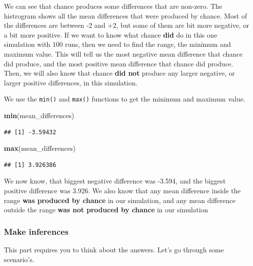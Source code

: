 \documentclass[]{book}
\newenvironment{Shaded}{\begin{snugshade}}{\end{snugshade}}
\newcommand{\KeywordTok}[1]{\textcolor[rgb]{0.13,0.29,0.53}{\textbf{{#1}}}}
\newcommand{\NormalTok}[1]{{#1}}
\theoremstyle{definition}
\theoremstyle{definition}
\theoremstyle{definition}
\theoremstyle{remark}
\begin{document}
We can see that chance produces some differences that are non-zero. The
histrogram shows all the mean differences that were produced by chance.
Most of the differences are between -2 and +2, but some of them are bit
more negative, or a bit more positive. If we want to know what chance
\textbf{did} do in this one simulation with 100 runs, then we need to
find the range, the minimum and maximum value. This will tell us the
most negative mean difference that chance did produce, and the most
positive mean difference that chance did produce. Then, we will also
know that chance \textbf{did not} produce any larger negative, or larger
positive differences, in this simulation.

We use the \texttt{min()} and \texttt{max()} functions to get the
minimum and maximum value.

\begin{Shaded}
\begin{Highlighting}[]
\KeywordTok{min}\NormalTok{(mean_differences)}
\end{Highlighting}
\end{Shaded}

\begin{verbatim}
## [1] -3.59432
\end{verbatim}

\begin{Shaded}
\begin{Highlighting}[]
\KeywordTok{max}\NormalTok{(mean_differences)}
\end{Highlighting}
\end{Shaded}

\begin{verbatim}
## [1] 3.926386
\end{verbatim}

We now know, that biggest negative difference was -3.594, and the
biggest positive difference was 3.926. We also know that any mean
difference inside the range \textbf{was produced by chance} in our
simulation, and any mean difference outside the range \textbf{was not
produced by chance} in our simulation

\subsubsection{Make inferences}\label{make-inferences}

This part requires you to think about the answers. Let's go through some
scenario's.
\end{document}
